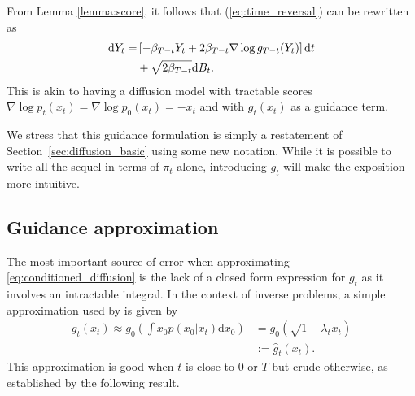 \documentclass{article}
\theoremstyle{plain}
\theoremstyle{definition}
\theoremstyle{remark}
\begin{document}
From Lemma \ref{lemma:score}, it follows that (\ref{eq:time_reversal}) can be rewritten as
\begin{align}
	\label{eq:conditioned_diffusion}
	\dd Y_t= & \left[ -\beta_{T-t}Y_t + 2\beta_{T-t}\nabla\log g_{T-t}(Y_t) \right] \dd t \\
	         & +\sqrt{2\beta_{T-t}} \dd B_t. \nonumber
\end{align}
This is akin to having a diffusion model with tractable scores $\nabla \log p_t(x_t)=\nabla \log p_0(x_t)=-x_t$ and with \(g_t(x_t)\) as a guidance term.

We stress that this guidance formulation is simply a restatement of Section~\ref{sec:diffusion_basic} using some new notation. While it is possible to write all the sequel in terms of $\pi_t$ alone, introducing $g_t$ will make the exposition more intuitive.





\subsection{Guidance approximation}
\label{sec:naive_approximation}
The most important source of error when approximating \eqref{eq:conditioned_diffusion} is the lack of  a closed form expression for $g_t$ as it involves an intractable integral. In the context of inverse problems, a simple approximation used by \cite{chung2023diffusion,song2023pseudoinverseguided} is given by
\begin{align}
	\label{eq:naive_approximation}
	\textstyle g_t(x_t)\approx g_0 (\int x_0 p(x_0|x_t)\mathrm{d}x_0 ) & = \textstyle
	g_0(\sqrt{1-\lambda_t}x_t) \nonumber
	\\&:=\hat{g}_t(x_t).
\end{align}
This approximation is good when $t$ is close to $0$ or $T$ but crude otherwise, as established by the following result.
\end{document}
